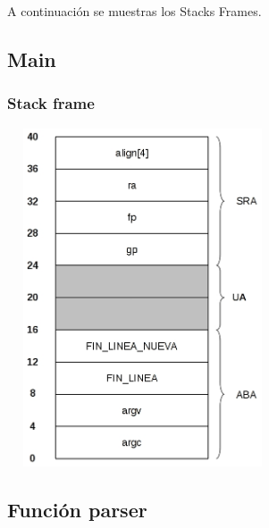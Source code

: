 \documentclass[a4paper,10pt]{article}
\begin{document}
  A continuaci\'on se muestras los Stacks Frames.

  \subsection{Main}
    \subsubsection{Stack frame}
      \begin{center}
	\includegraphics[width=8cm, height=10cm]{DibujosStackFrame/stack-main.jpg}
      \end{center}

  \subsection{Funci\'on parser}
\end{document}
